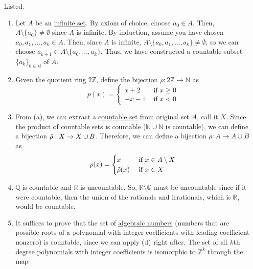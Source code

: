   \begin{solution}
    Listed. 
    \begin{enumerate}
      \item Let $A$ be an \hyperref[st-def:infinite-set]{infinite set}. By axiom of choice, choose $a_0 \in A$. Then, $A \setminus \{a_0\} \neq \emptyset$ since $A$ is infinite. By induction, assume you have chosen $a_0, a_1, \ldots, a_k \in A$. Then, since $A$ is infinite, $A \setminus \{a_0, a_1, \ldots, a_k\} \neq \emptyset$, so we can choose $a_{k+1} \in A \setminus \{a_0, \ldots, a_k\}$. Thus, we have constructed a countable subset $\{a_k\}_{k \in \mathbb{N}}$ of $A$. 
      \item Given the quotient ring $2\mathbb{Z}$, define the bijection $\rho: 2\mathbb{Z} \to \mathbb{N}$ as 
      \begin{equation}
        p(x) = \begin{cases}
              x + 2 & \text{ if } x \geq 0 \\
              -x - 1 & \text{ if } x < 0
              \end{cases}
      \end{equation}
      \item From (a), we can extract a \hyperref[st-def:countable]{countable set} from original set $A$, call it $X$. Since the product of countable sets is countable ($\mathbb{N} \cup \mathbb{N}$ is countable), we can define a bijection $\Tilde{\rho}: X \to X \cup B$. Therefore, we can define a bijection $\rho: A \to A \cup B$ as 
      \begin{equation}
        \rho(x) = \begin{cases}
              x & \text{ if } x \in A \setminus X \\
              \Tilde{\rho}(x) & \text{ if } x \in X
              \end{cases}
      \end{equation}
      \item $\mathbb{Q}$ is countable and $\mathbb{R}$ is uncountable. So, $\mathbb{R} \setminus \mathbb{Q}$ must be uncountable since if it were countable, then the union of the rationals and irrationals, which is $\mathbb{R}$, would be countable. 
      \item It suffices to prove that the set of \hyperref[alg-def:algebraic-numbers]{algebraic numbers} (numbers that are possible roots of a polynomial with integer coefficients with leading coefficient nonzero) is countable, since we can apply (d) right after. The set of all $k$th degree polynomials with integer coefficients is isomorphic to $\mathbb{Z}^k$ through the map 

\end{enumerate}
\end{solution}
